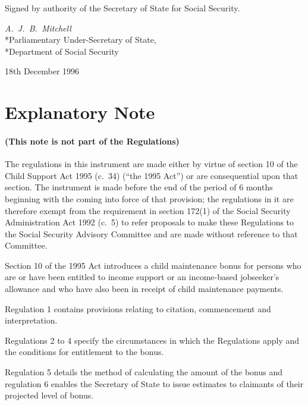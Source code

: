 \documentclass[12pt,a4paper]{article}
\begin{document}

\bigskip

Signed by authority of the Secretary of State for Social Security.

{\raggedleft
\emph{A.\ J.\ B.\ Mitchell}\\*Parliamentary Under-Secretary of
State,\\*Department of Social Security

}

18th December 1996

\small

\part{Explanatory Note}

\renewcommand\parthead{--- Explanatory Note}

\subsection*{(This note is not part of the Regulations)}

The regulations in this instrument are made either by virtue of section 10 of the Child Support Act 1995 (c.\ 34) (“the 1995 Act”) or are consequential upon that section. The instrument is made before the end of the period of 6 months beginning with the coming into force of that provision; the regulations in it are therefore exempt from the requirement in section 172(1) of the Social Security Administration Act 1992 (c.\ 5) to refer proposals to make these Regulations to the Social Security Advisory Committee and are made without reference to that Committee.

  Section 10 of the 1995 Act introduces a child maintenance bonus for persons who are or have been entitled to income support or an income-based jobseeker’s allowance and who have also been in receipt of child maintenance payments.

  Regulation 1 contains provisions relating to citation, commencement and interpretation.

  Regulations 2 to 4 specify the circumstances in which the Regulations apply and the conditions for entitlement to the bonus.

  Regulation 5 details the method of calculating the amount of the bonus and regulation 6 enables the Secretary of State to issue estimates to claimants of their projected level of bonus.
\end{document}
